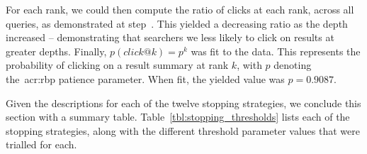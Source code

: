 \begin{figure}[h]
    \centering
    \vspace{4mm}
    \label{fig:rbp_patience}
    \vspace{-5mm}
\end{figure}

For each rank, we could then compute the ratio of clicks at each rank, across all queries, as demonstrated at step~. This yielded a decreasing ratio as the depth increased -- demonstrating that searchers we less likely to click on results at greater depths. Finally, $p(click@k) = p^k$ was fit to the data. This represents the probability of clicking on a result summary at rank $k$, with $p$ denoting the~\gls{acr:rbp} patience parameter. When fit, the yielded value was $p=0.9087$.

Given the descriptions for each of the twelve stopping strategies, we conclude this section with a summary table. Table~\ref{tbl:stopping_thresholds} lists each of the stopping strategies, along with the different threshold parameter values that were trialled for each.

